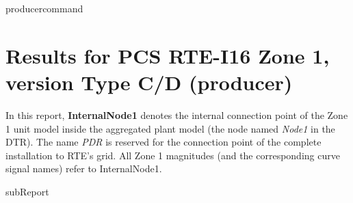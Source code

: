 {{ producercommand }}



    \section{Results for PCS RTE-I16 Zone 1, version Type C/D ({{producer}})}

    In this report, \textbf{InternalNode1} denotes the internal connection point of the
    Zone 1 unit model inside the aggregated plant model (the node named \emph{Node1} in
    the DTR). The name \emph{PDR} is reserved for the connection point of the complete
    installation to RTE's grid. All Zone 1 magnitudes (and the corresponding curve signal
    names) refer to InternalNode1.

    {{subReport}}
    \newpage

